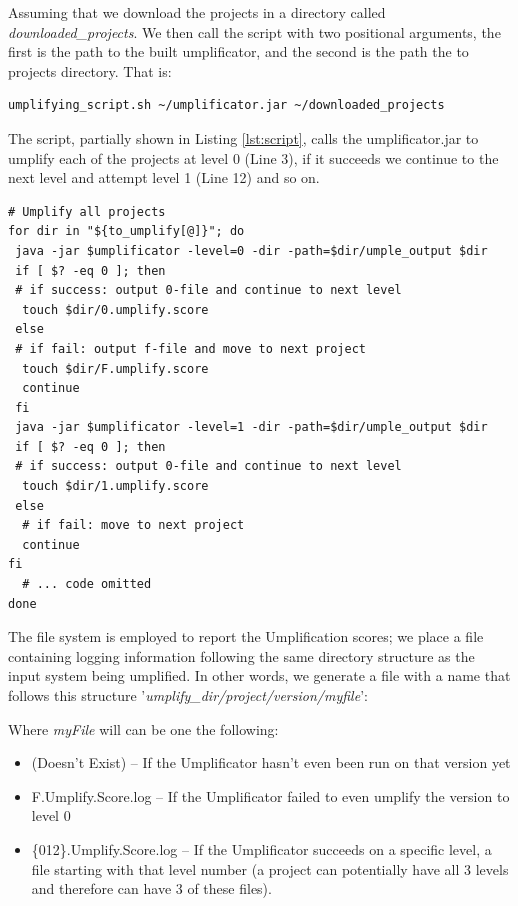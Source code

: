 Assuming that we download the projects in a directory called \textit{downloaded\_projects}. We then call the script with two positional arguments, the first is the path to the built umplificator, and the second is the path the to projects directory. That is:

\vspace{\baselineskip}
\begin{lstlisting}[style=umplePlain]
   umplifying_script.sh ~/umplificator.jar ~/downloaded_projects
\end{lstlisting}

The script, partially shown in Listing \ref{lst:script}, calls the umplificator.jar to umplify each of the projects at level 0 (Line 3), if it succeeds we continue to the next level and attempt level 1 (Line 12) and so on. 

\begin{lstlisting}[style=mine, label=lst:script, caption=Part of the script responsible to umplify and report results]
# Umplify all projects
for dir in "${to_umplify[@]}"; do
 java -jar $umplificator -level=0 -dir -path=$dir/umple_output $dir
 if [ $? -eq 0 ]; then 
 # if success: output 0-file and continue to next level
  touch $dir/0.umplify.score
 else 
 # if fail: output f-file and move to next project
  touch $dir/F.umplify.score
  continue
 fi
 java -jar $umplificator -level=1 -dir -path=$dir/umple_output $dir 
 if [ $? -eq 0 ]; then 
 # if success: output 0-file and continue to next level
  touch $dir/1.umplify.score
 else 
  # if fail: move to next project
  continue
fi
  # ... code omitted
done
\end{lstlisting}

The file system is employed to report the Umplification scores; we place a file containing logging information following the same directory structure as the input system being umplified. In other words, 
we generate a file with a name that follows this structure '\textit{umplify\_dir/project/version/myfile}':

Where \textit{myFile} will can be one the following:
\begin{itemize}
\item (Doesn't Exist) -- If the Umplificator hasn't even been run on that version yet
\item F.Umplify.Score.log -- If the Umplificator failed to even umplify the version to level 0
\item \{012\}.Umplify.Score.log -- If the Umplificator succeeds on a specific level, a file starting with that level number (a project can potentially have all 3 levels and therefore can have 3 of these files).
\end{itemize}

